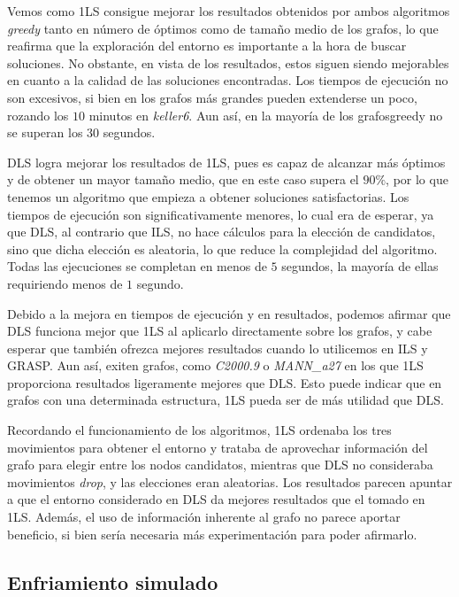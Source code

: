Vemos como 1LS consigue mejorar los resultados obtenidos por ambos algoritmos
\textit{greedy} tanto en número de óptimos como de tamaño medio de los grafos,
lo que reafirma que la exploración del entorno es importante a la hora de buscar
soluciones. No obstante, en vista de los resultados, estos siguen siendo mejorables
en cuanto a la calidad de las soluciones encontradas. Los tiempos de ejecución no
son excesivos, si bien en los grafos más grandes pueden extenderse un poco,
rozando los $10$ minutos en \textit{keller6}. Aun así, en la mayoría de los grafosgreedy
no se superan los $30$ segundos.

DLS logra mejorar los resultados de 1LS, pues es capaz de alcanzar más óptimos
y de obtener un mayor tamaño medio, que en este caso supera el $90\%$, por lo
que tenemos un algoritmo que empieza a obtener soluciones satisfactorias.
Los tiempos de ejecución son significativamente menores, lo cual era de esperar,
ya que DLS, al contrario que ILS, no hace cálculos para la elección de candidatos,
sino que dicha elección es aleatoria, lo que reduce la complejidad del algoritmo.
Todas las ejecuciones se completan en menos de $5$ segundos, la mayoría de ellas
requiriendo menos de $1$ segundo.

Debido a la mejora en tiempos de ejecución y en resultados, podemos afirmar que
DLS funciona mejor que 1LS al aplicarlo directamente sobre los grafos, y cabe esperar
que también ofrezca mejores resultados cuando lo utilicemos en ILS y GRASP. Aun así,
exiten grafos, como \textit{C2000.9} o \textit{MANN\_a27} en los que 1LS proporciona
resultados ligeramente mejores que DLS. Esto puede indicar que en grafos con una
determinada estructura, 1LS pueda ser de más utilidad que DLS.

Recordando el funcionamiento de los algoritmos, 1LS ordenaba los tres movimientos
para obtener el entorno y trataba de aprovechar información del grafo para elegir
entre los nodos candidatos, mientras que DLS no consideraba movimientos \textit{drop},
y las elecciones eran aleatorias. Los resultados parecen apuntar a que el entorno
considerado en DLS da mejores resultados que el tomado en 1LS. Además, el uso de
información inherente al grafo no parece aportar beneficio, si bien sería necesaria
más experimentación para poder afirmarlo.

\subsection{Enfriamiento simulado}

